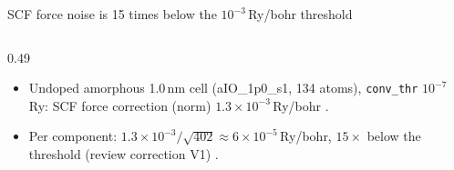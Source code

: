\begin{frame}[t]{SCF force noise is 15 times below the $10^{-3}$\,Ry/bohr threshold}
\begin{columns}[T,onlytextwidth]
\begin{column}{0.49\textwidth}
\begin{itemize}
          $\delta F \propto \sqrt{\smash[b]{\texttt{conv\_thr}}}$.
        \item Undoped amorphous 1.0\,nm cell (aIO\_1p0\_s1, 134 atoms), \texttt{conv\_thr} $10^{-7}$\,Ry: SCF force
          correction (norm) $1.3\times10^{-3}$\,Ry/bohr .
        \item Per component: $1.3\times10^{-3}/\sqrt{402} \approx 6\times10^{-5}$\,Ry/bohr, $15\times$ below
          the threshold (review correction V1) .
      \end{itemize}
    \end{column}
  \end{columns}
\end{frame}
